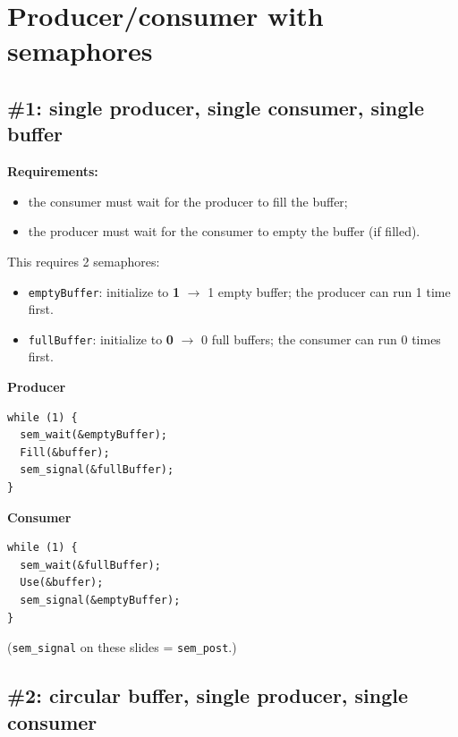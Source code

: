 \documentclass[11pt,a4paper]{article}
\begin{document}
\section{Producer/consumer with semaphores}

\subsection{\#1: single producer, single consumer, single buffer}

\textbf{Requirements:}
\begin{itemize}
  \item the consumer must wait for the producer to fill the buffer;
  \item the producer must wait for the consumer to empty the buffer (if
        filled).
\end{itemize}
This requires 2 semaphores:
\begin{itemize}
  \item \texttt{emptyBuffer}: initialize to \textbf{1} \(\to\) 1 empty
        buffer; the producer can run 1 time first.
  \item \texttt{fullBuffer}: initialize to \textbf{0} \(\to\) 0 full
        buffers; the consumer can run 0 times first.
\end{itemize}

\begin{center}
\begin{minipage}[t]{0.47\textwidth}
\textbf{Producer}
\begin{lstlisting}[numbers=none]
while (1) {
  sem_wait(&emptyBuffer);
  Fill(&buffer);
  sem_signal(&fullBuffer);
}
\end{lstlisting}
\end{minipage}\hfill
\begin{minipage}[t]{0.47\textwidth}
\textbf{Consumer}
\begin{lstlisting}[numbers=none]
while (1) {
  sem_wait(&fullBuffer);
  Use(&buffer);
  sem_signal(&emptyBuffer);
}
\end{lstlisting}
\end{minipage}
\end{center}
(\texttt{sem\_signal} on these slides = \texttt{sem\_post}.)

\subsection{\#2: circular buffer, single producer, single consumer}
\end{document}
